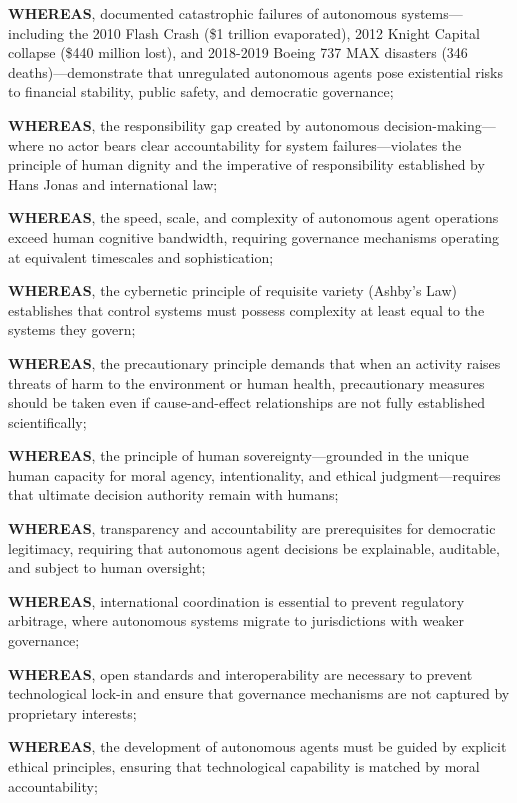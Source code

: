 \textbf{WHEREAS}, documented catastrophic failures of autonomous systems—including the 2010 Flash Crash (\$1 trillion evaporated), 2012 Knight Capital collapse (\$440 million lost), and 2018-2019 Boeing 737 MAX disasters (346 deaths)—demonstrate that unregulated autonomous agents pose existential risks to financial stability, public safety, and democratic governance;

\textbf{WHEREAS}, the responsibility gap created by autonomous decision-making—where no actor bears clear accountability for system failures—violates the principle of human dignity and the imperative of responsibility established by Hans Jonas and international law;

\textbf{WHEREAS}, the speed, scale, and complexity of autonomous agent operations exceed human cognitive bandwidth, requiring governance mechanisms operating at equivalent timescales and sophistication;

\textbf{WHEREAS}, the cybernetic principle of requisite variety (Ashby's Law) establishes that control systems must possess complexity at least equal to the systems they govern;

\textbf{WHEREAS}, the precautionary principle demands that when an activity raises threats of harm to the environment or human health, precautionary measures should be taken even if cause-and-effect relationships are not fully established scientifically;

\textbf{WHEREAS}, the principle of human sovereignty—grounded in the unique human capacity for moral agency, intentionality, and ethical judgment—requires that ultimate decision authority remain with humans;

\textbf{WHEREAS}, transparency and accountability are prerequisites for democratic legitimacy, requiring that autonomous agent decisions be explainable, auditable, and subject to human oversight;

\textbf{WHEREAS}, international coordination is essential to prevent regulatory arbitrage, where autonomous systems migrate to jurisdictions with weaker governance;

\textbf{WHEREAS}, open standards and interoperability are necessary to prevent technological lock-in and ensure that governance mechanisms are not captured by proprietary interests;

\textbf{WHEREAS}, the development of autonomous agents must be guided by explicit ethical principles, ensuring that technological capability is matched by moral accountability;

